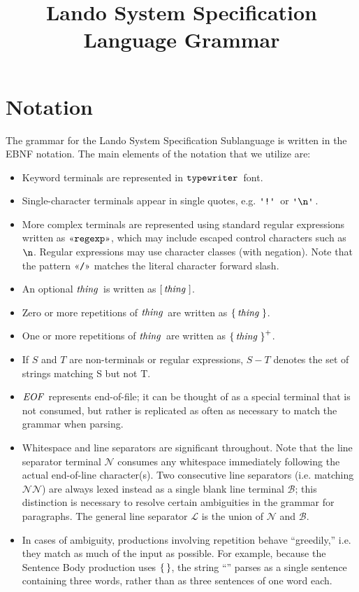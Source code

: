 \documentclass{article}
\newcommand{\gnn}{\ensuremath{\mathcal{N}}}
\newcommand{\gnl}{\ensuremath{\mathcal{L}}}
\newcommand{\gnb}{\ensuremath{\mathcal{B}}}
\begin{document}
\title{Lando System Specification Language Grammar}
\maketitle

\section{Notation}

The grammar for the Lando System Specification Sublanguage is written in the EBNF notation. The main elements of the notation that we utilize are:
\begin{itemize}
  \item Keyword terminals are represented in $\mathop{\texttt{typewriter}}\,$ font. 
  \item Single-character terminals appear in single quotes, e.g. $\gtkc{!}$ or $\gtkc{\gtesc{n}}$.
  \item More complex terminals are represented using standard regular expressions written as $\gtregex{regexp}$, which may include escaped control characters such as $\texttt{\textbackslash {n}}$. Regular expressions may use character classes (with negation). Note that the pattern $\gtregex{/}$ matches the literal character forward slash.
  \item An optional $\mathop{\textit{thing}}\,$ is written as $\mathop{\operatorname{[} \mathop{\mathop{\textit{thing}}\,} \operatorname{]}}$.
  \item {Zero or more repetitions of $\mathop{\textit{thing}}\,$ are written as $\mathop{\operatorname{\{} \mathop{\textit{thing}}\, \operatorname{\}}}$}.
  \item One or more repetitions of $\mathop{\textit{thing}}\,$ are written as $\mathop{\operatorname{\{} \mathop{\textit{thing}}\, \operatorname{\}}^+}$.
  \item If $S$ and $T$ are non-terminals or regular expressions, $S - T$ denotes the set of strings matching S but not T.
  \item $\mathop{\textit{EOF}}\,$ represents end-of-file; it can be thought of as a special terminal that is not consumed, but rather is replicated as often as necessary to match the grammar when parsing.
  \item Whitespace and line separators are significant throughout. Note that the line separator terminal $\gnn$ consumes any whitespace immediately following the actual end-of-line character(s). Two consecutive line separators (i.e. matching $\gnn\gnn$) are always lexed instead as a single blank line terminal $\gnb$;
    this distinction is necessary to resolve certain ambiguities in the grammar for paragraphs.
    The general line separator $\gnl$ is the union of $\gnn$ and $\gnb$.
 \item In cases of ambiguity, productions involving repetition behave ``greedily,'' i.e. they match as much of the input as possible.
    For example, because the Sentence Body production uses $\mathop{\operatorname{\{}  \operatorname{\}}}$,  the string ``'' parses as a single sentence
    containing three words, rather than as three sentences of one word each.
\end{itemize}
\end{document}
